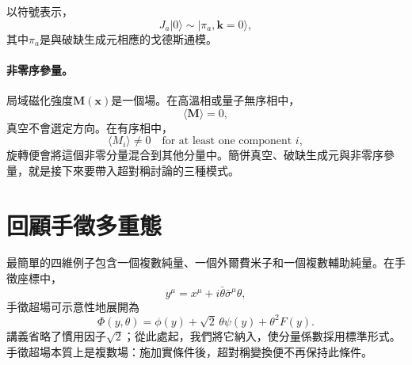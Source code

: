 \begin{classroomqa}
\end{classroomqa}

\begin{classroomqa}
\end{classroomqa}

以符號表示，
\begin{equation}
J_a|0\rangle
\sim
|\pi_a,\mathbf k=0\rangle,
\label{eq:l9-generator-goldstone}
\end{equation}
其中\(\pi_a\)是與破缺生成元相應的戈德斯通模。

\paragraph{非零序參量。}
局域磁化強度\(\mathbf M(\mathbf x)\)是一個場。在高溫相或量子無序相中，
\begin{equation}
\langle\mathbf M\rangle=0,
\end{equation}
真空不會選定方向。在有序相中，
\begin{equation}
\langle M_i\rangle\neq0
\quad\text{for at least one component }i,
\label{eq:l9-magnetization-order}
\end{equation}
旋轉便會將這個非零分量混合到其他分量中。簡併真空、破缺生成元與非零序參量，就是接下來要帶入超對稱討論的三種模式。

\section{回顧手徵多重態}

最簡單的四維例子包含一個複數純量、一個外爾費米子和一個複數輔助純量。在手徵座標中，
\begin{equation}
y^\mu=x^\mu+i\bar\theta\bar\sigma^\mu\theta,
\end{equation}
手徵超場可示意性地展開為
\begin{equation}
\Phi(y,\theta)=
\phi(y)+\sqrt2\,\theta\psi(y)+\theta^2F(y).
\label{eq:l9-chiral-expansion}
\end{equation}
講義省略了慣用因子\(\sqrt2\)；從此處起，我們將它納入，使分量係數採用標準形式。手徵超場本質上是複數場：施加實條件後，超對稱變換便不再保持此條件。

